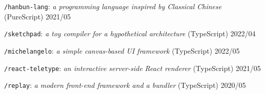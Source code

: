\documentclass[10pt]{article}
\begin{document}
\vspace{0.5em}
\texttt{/hanbun-lang}: \textit{a programming language inspired by Classical Chinese} \hfill (PureScript) 2021/05

\vspace{0.5em}
\texttt{/sketchpad}: \textit{a toy compiler for a hypothetical architecture} \hfill (TypeScript) 2022/04

\vspace{0.5em}
\texttt{/michelangelo}: \textit{a simple canvas-based UI framework} \hfill (TypeScript)  2022/05

\vspace{0.5em}
\texttt{/react-teletype}: \textit{an interactive server-side React renderer} \hfill (TypeScript) 2021/05

\vspace{0.5em}
\texttt{/replay}: \textit{a modern front-end framework and a bundler} \hfill (TypeScript) 2020/05
\end{document}
